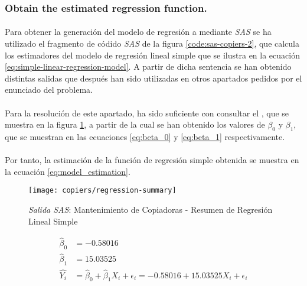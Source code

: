 \documentclass{article}
\begin{document}
      \subsubsection{Obtain the estimated regression function.}

        \paragraph{}
        Para obtener la generación del modelo de regresión a mediante \emph{SAS} se ha utilizado el fragmento de códido \emph{SAS} de la figura \ref{code:sas-copiers-2}, que calcula los estimadores del modelo de regresión lineal simple que se ilustra en la ecuación \eqref{eq:simple-linear-regression-model}. A partir de dicha sentencia se han obtenido distintas salidas que después han sido utilizadas en otros apartados pedidos por el enunciado del problema.

        \paragraph{}
        Para la resolución de este apartado, ha sido suficiente con consultar el , que se muestra en la figura \ref{img:copiers-regression-summary}, a partir de la cual se han obtenido los valores de $\beta_0$ y $\beta_1$, que se muestran en las ecuaciones \eqref{eq:beta_0} y \eqref{eq:beta_1} respectivamente.

        \paragraph{}
        Por tanto, la estimación de la función de regresión simple obtenida se muestra en la ecuación \eqref{eq:model_estimation}.

        \begin{figure}[!h]
          \centering
          \texttt{[image: copiers/regression-summary]}
          \caption{\emph{Salida SAS}: Mantenimiento de Copiadoras - Resumen de Regresión Lineal Simple}
          \label{img:copiers-regression-summary}
        \end{figure}

        \begin{align}
        \label{eq:beta_0}
          \widehat{\beta}_0 &= -0.58016\\
        \label{eq:beta_1}
          \widehat{\beta}_1 &= 15.03525\\
        \label{eq:model_estimation}
          \widehat{Y_i} &= \widehat{\beta}_0 +\widehat{\beta}_1X_i + \epsilon_i = -0.58016 + 15.03525 X_i + \epsilon_i
        \end{align}
\end{document}
